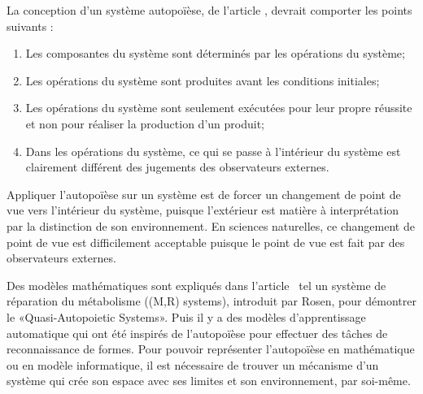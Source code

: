 
La conception d'un système autopoïèse, de l'article \cite{tatsuya_computational_autopoiesis_2000}, devrait comporter les points suivants : 

\begin{enumerate}
    \item Les composantes du système sont déterminés par les opérations du système;
    \item Les opérations du système sont produites avant les conditions initiales;
    \item Les opérations du système sont seulement exécutées pour leur propre réussite et non pour réaliser la production d'un produit;
    \item Dans les opérations du système, ce qui se passe à l'intérieur du système est clairement différent des jugements des observateurs externes.
\end{enumerate}



Appliquer l'autopoïèse sur un système est de forcer un changement de point de vue vers l'intérieur du système, puisque l'extérieur est matière à interprétation par la distinction de son environnement. En sciences naturelles, ce changement de point de vue est difficilement acceptable puisque le point de vue est fait par des observateurs externes.

Des modèles mathématiques sont expliqués dans l'article~\cite{tatsuya_computational_autopoiesis_2000} tel un système de réparation du métabolisme ((M,R) systems), introduit par Rosen, pour démontrer le «Quasi-Autopoietic Systems».
Puis il y a des modèles d'apprentissage automatique qui ont été inspirés de l'autopoïèse pour effectuer des tâches de reconnaissance de formes. Pour pouvoir représenter l'autopoïèse en mathématique ou en modèle informatique, il est nécessaire de trouver un mécanisme d'un système qui crée son espace avec ses limites et son environnement, par soi-même.

